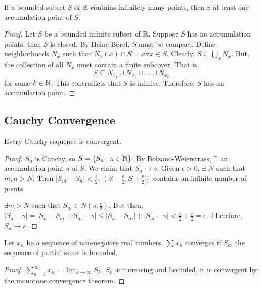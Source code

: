 \begin{theorem}
    If a bounded subset $S$ of $\mathbb{R}$ contains infinitely many points, then $\exists$ at least one accumulation point of $S$.
\end{theorem}
\begin{proof}
    Let $S$ be a bounded infinite subset of $\mathbb{R}$. Suppose $S$ has no accumulation points, then $S$ is closed. By Heine-Borel, $S$ must be compact. Define neighborhoods $N_x$ such that $N_x(x) \cap S = {x} \forall x \in S$. Clearly, $S \subseteq \bigcup_x N_x$. But, the collection of all $N_x$ must contain a finite subcover. That is, $$S \subseteq N_{x_1} \cup N_{x_2} \cup \ldots \cup N_{x_k}$$ for some $k \in \mathbb{N}$. This contradicts that $S$ is infinite. Therefore, $S$ has an accumulation point.
\end{proof}

\subsection{Cauchy Convergence}
\begin{theorem}
    Every Cauchy sequence is convergent.
\end{theorem}
\begin{proof}
    $S_n$ is Cauchy, so $S = \{S_n \mid n \in \mathbb{N}\}$. By Bolzano-Weierstrass, $\exists$ an accumulation point $s$ of $S$. We claim that $S_n \rightarrow s$. Given $\epsilon > 0$, $\exists$ $N$ such that $m, n > N$. Then $|S_m - S_n| < \frac{\epsilon}{2}$. $(S - \frac{\epsilon}{2}, S + \frac{\epsilon}{2})$ contains an infinite number of points. 
    
    $\exists m > N$ such that $S_m \in N(s, \frac{\epsilon}{2})$. But then, $|S_n - s| = |S_n - S_m + S_m - s| \leq |S_n - S_m| + |S_m - s| < \frac{\epsilon}{2} + \frac{\epsilon}{2} = \epsilon$. Therefore, $S_n \rightarrow s$.
\end{proof}

\begin{theorem}
    Let $x_n$ be a sequence of non-negative real numbers. $\sum x_n$ converges if $S_k$, the sequence of partial sums is bounded.
\end{theorem}
\begin{proof}
    $\sum_{n=1}^\infty x_n = \lim_{k \to \infty} S_k$. $S_k$ is increasing and bounded, it is convergent by the monotone convergence theorem.
\end{proof}